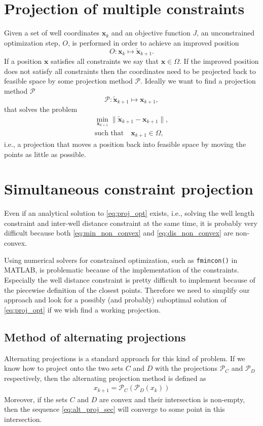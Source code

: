 \section{Projection of multiple constraints}
%
Given a set of well coordinates $\textbf{x}_k$ and an
objective function $J$, an unconstrained optimization 
step, $O$, is performed in order to achieve an improved position
\begin{equation}
O: \textbf{x}_k \mapsto  \tilde{\textbf{x}}_{k+1}.
\end{equation}
%
If a position $\textbf{x}$ satisfies all constraints we say
that $\textbf{x} \in \Omega$.
%
If the improved position does
not satisfy all constraints then the coordinates need to be
projected back to feasible space by some projection method $\mathcal{P}$.
Ideally we want to find a projection method $\mathcal{P}$
%
\begin{equation}
\mathcal{P}: \tilde{\textbf{x}}_{k+1} \mapsto \textbf{x}_{k+1},
\end{equation}
%
that solves the problem
%
\begin{align}
\min_{\textbf{x}_{k+1}} \| \tilde{\textbf{x}}_{k+1} - \textbf{x}_{k+1} \|, \label{eq:proj_opt}\\
\text{such that} \quad \textbf{x}_{k+1} \in \Omega,
\end{align}
%
i.e., a projection that moves a position back into feasible
space by moving the points as little as possible.
%
%
\section{Simultaneous constraint projection}
% 
Even if an analytical solution to \eqref{eq:proj_opt} exists, i.e., 
solving the well length constraint and inter-well distance constraint at
the same time, it is probably very difficult because both
\eqref{eq:min_non_convex} and \eqref{eq:dis_non_convex} are non-convex.

Using numerical solvers for constrained optimization, such as \texttt{fmincon()}
in MATLAB\cite{Matlab}, is problematic because of the implementation of 
the constraints. Especially the well distance constraint is pretty difficult 
to implement because of the piecewise definition of the closest points.
Therefore we need to simplify our approach and look for a possibly (and 
probably) suboptimal solution of \eqref{eq:proj_opt} if we wish find a working
projection. 
%
\subsection{Method of alternating projections}
%
Alternating projections is a standard approach for this kind of problem.
If we know how to project onto the two sets $C$ and $D$ with the 
projections $\mathcal{P}_C$ and $\mathcal{P}_D$ respectively, then the
alternating projection method is defined as
%
\begin{align}
x_{k+1} = \mathcal{P}_C \left( \mathcal{P}_D ( x_k ) \right)
\label{eq:alt_proj_sec}
\end{align}
%
Moreover, if the sets $C$ and $D$ are convex and their intersection is non-empty, then the 
sequence \eqref{eq:alt_proj_sec} will converge to some point in this intersection.

